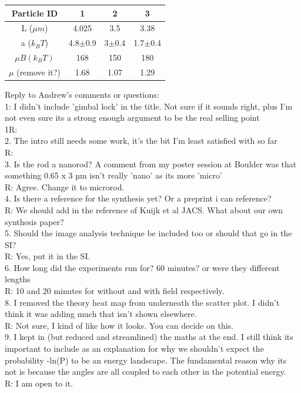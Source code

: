 \documentclass[aps,prl, twocolumn,groupedaddress]{revtex4}
\begin{document}
\begin{center}
\centering
\begin{tabular}{|c|c|c|c|}
\hline
Particle ID & 1 & 2 & 3\\
\hline
L ($\mu m$)  &  4.025 &  3.5 & 3.38\\
\hline
a ($k_BT$) & 4.8$\pm$0.9 & 3$\pm$0.4 & 1.7$\pm$0.4\\
\hline
$\mu B (k_BT)$ & 168 & 150 & 180 \\
\hline
$\mu $  (remove it?)& 1.68 & 1.07 & 1.29 \\
\hline
\end{tabular}
\end{center}

Reply to Andrew's comments or questions:\\
1: I didn't include 'gimbal lock' in the title. Not sure if it sounds right, plus I'm not even sure its a strong enough argument to be the real selling point\\
1R:\\
2. The intro still needs some work, it's the bit I'm least satisfied with so far\\
R:\\
3. Is the rod a nanorod? A comment from my poster session at Boulder was that something 0.65 x 3 µm isn't really 'nano' as its more 'micro'\\
R: Agree. Change it to microrod. \\
4. Is there a reference for the synthesis yet? Or a preprint i can reference?\\
R: We should add in the reference of  Kuijk et al JACS. What about our own synthesis paper?\\
5. Should the image analysis technique be included too or should that go in the SI?\\
R: Yes, put it in the SI.\\
6. How long did the experiments run for? 60 minutes? or were they different lengths\\
R: 10 and 20 minutes for without and with field respectively.\\ 
8. I removed the theory heat map from underneath the scatter plot. I didn't think it was adding much that isn't shown elsewhere.\\
R: Not sure, I kind of like how it looks. You can decide on this.\\
9. I kept in (but reduced and streamlined) the maths at the end. I still think its important to include as an explanation for why we shouldn't expect the probability -ln(P) to be an energy landscape. The fundamental reason why its not is because the angles are all coupled to each other in the potential energy.\\
R: I am open to it.
\end{document}
